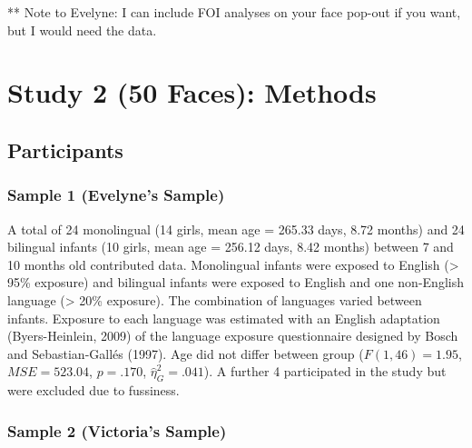 \documentclass[english,man,floatsintext]{apa6}
\begin{document}
** Note to Evelyne: I can include FOI analyses on your face pop-out if you want, but I would need the data.

\hypertarget{study-2-50-faces-methods}{%
\section{Study 2 (50 Faces): Methods}\label{study-2-50-faces-methods}}

\hypertarget{participants-1}{%
\subsection{Participants}\label{participants-1}}

\hypertarget{sample-1-evelynes-sample}{%
\subsubsection{Sample 1 (Evelyne's Sample)}\label{sample-1-evelynes-sample}}

A total of 24 monolingual (14 girls, mean age = 265.33 days, 8.72 months) and 24 bilingual infants (10 girls, mean age = 256.12 days, 8.42 months) between 7 and 10 months old contributed data. Monolingual infants were exposed to English (\textgreater{} 95\% exposure) and bilingual infants were exposed to English and one non-English language (\textgreater{} 20\% exposure). The combination of languages varied between infants. Exposure to each language was estimated with an English adaptation (Byers-Heinlein, 2009) of the language exposure questionnaire designed by Bosch and Sebastian-Gallés (1997). Age did not differ between group (\(F(1, 46) = 1.95\), \(\mathit{MSE} = 523.04\), \(p = .170\), \(\hat{\eta}^2_G = .041\)). A further 4 participated in the study but were excluded due to fussiness.

\hypertarget{sample-2-victorias-sample}{%
\subsubsection{Sample 2 (Victoria's Sample)}\label{sample-2-victorias-sample}}
\end{document}
